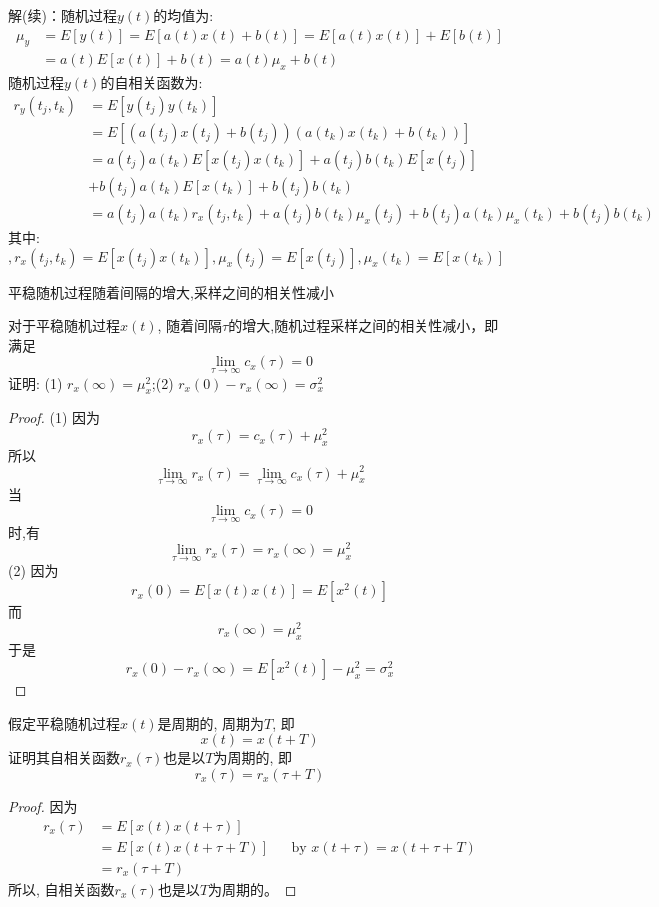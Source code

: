 \begin{frame}
解(续)：随机过程$y(t)$的均值为:
\begin{align*}
\mu_y&=E[y(t)]=E[a(t)x(t)+b(t)]=E[a(t)x(t)]+E[b(t)]\\
&=a(t)E[x(t)]+b(t)=a(t)\mu_x+b(t)
\end{align*}
随机过程$y(t)$的自相关函数为:
\begin{align*}
r_y(t_j,t_k)&=E[y(t_j)y(t_k)]\\
&=E[(a(t_j)x(t_j)+b(t_j))(a(t_k)x(t_k)+b(t_k))]\\
&=a(t_j)a(t_k)E[x(t_j)x(t_k)]+a(t_j)b(t_k)E[x(t_j)]\\
&+b(t_j)a(t_k)E[x(t_k)]+b(t_j)b(t_k)\\
&=a(t_j)a(t_k)r_x(t_j,t_k)+a(t_j)b(t_k)\mu_x(t_j)+b(t_j)a(t_k)\mu_x(t_k)+b(t_j)b(t_k)
\end{align*}
其中: $,r_x(t_j,t_k)=E[x(t_j)x(t_k)],\mu_x(t_j)=E[x(t_j)], \mu_x(t_k)=E[x(t_k)]$
\end{frame}

\begin{frame}{平稳随机过程随着间隔的增大,采样之间的相关性减小}
\begin{example}
	对于平稳随机过程$x(t)$, 随着间隔$\tau$的增大,随机过程采样之间的相关性减小，即满足
	\[\lim\limits_{\tau\to\infty}c_x(\tau)=0 \]
	证明: (1) $r_x(\infty)=\mu_x^2$;\qquad  (2) $r_x(0)-r_x(\infty)=\sigma_x^2$
\end{example}
\end{frame}

\begin{frame}[shrink]
\begin{proof}
	(1) 因为 
		$$r_x(\tau)=c_x(\tau)+\mu_x^2$$
		所以
		$$\lim\limits_{\tau\to\infty}r_x(\tau)=\lim\limits_{\tau\to\infty}c_x(\tau)+\mu_x^2$$
		当
		$$\lim\limits_{\tau\to\infty}c_x(\tau)=0$$
		时,有
		$$\lim\limits_{\tau\to\infty}r_x(\tau)=r_x(\infty)=\mu_x^2$$
	(2) 因为
		$$r_x(0)=E[x(t)x(t)]=E[x^2(t)] $$
		而
		$$r_x(\infty)=\mu_x^2$$
		于是
		$$r_x(0)-r_x(\infty)=E[x^2(t)]-\mu_x^2=\sigma_x^2$$
\end{proof}
\end{frame}

\begin{frame}[shrink]
\begin{example}
	假定平稳随机过程$x(t)$是周期的, 周期为$T$, 即
	\[x(t)=x(t+T) \]
	证明其自相关函数$r_x(\tau)$也是以$T$为周期的, 即
	\[r_x(\tau)=r_x(\tau+T) \]
\end{example}
\begin{proof}
因为
\begin{align*}
r_x(\tau)&=E[x(t)x(t+\tau)]\\
&=E[x(t)x(t+\tau+T)]&& \text{by } x(t+\tau)=x(t+\tau+T)\\
&=r_x(\tau+T)
\end{align*}
所以, 自相关函数$r_x(\tau)$也是以$T$为周期的。
\end{proof}
\end{frame}

